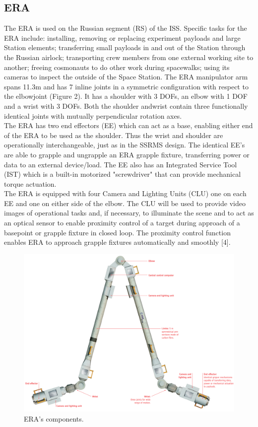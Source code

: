 \documentclass[a4paper,12pt,oneside]{report}
\begin{document}
\subsection{ERA}
The ERA is used on the Russian segment (RS) of the ISS. Specific tasks for the ERA include: installing, removing or replacing experiment payloads
and large Station elements; transferring small payloads in and out of the Station through the Russian airlock; transporting crew members from one external working site
to another; freeing cosmonauts to do other work during spacewalks; using its cameras to inspect the outside of the Space Station.
The ERA manipulator arm spans 11.3m and has 7 inline joints in a symmetric configuration with respect to the elbowjoint (Figure 2). It has a shoulder with 3 DOFs, an elbow with 1 DOF and a wrist with 3 DOFs. Both the shoulder andwrist contain three functionally identical joints with mutually perpendicular rotation axes.\\
The ERA has two end effectors (EE) which can act as a base, enabling either end of the ERA to be used as the shoulder. Thus the wrist and shoulder are operationally interchangeable, just as in the SSRMS design. The identical EE’s are able to grapple and ungrapple an ERA grapple fixture, transferring power or data to an external device/load. The EE also has an Integrated Service Tool (IST) which is a built-in motorized "screwdriver" that can provide mechanical torque
actuation.\\
The ERA is equipped with four Camera and Lighting Units (CLU) one on each EE and one on either side of the elbow. The CLU will be used to provide video images of operational tasks and, if necessary, to illuminate the scene and to act as an optical sensor to enable proximity control of a target during approach of a basepoint or grapple fixture in closed loop. The proximity control function enables ERA to approach grapple fixtures automatically and smoothly [4].
\begin{figure}[h]
  \centering
  \includegraphics[scale=0.4]{ERA.png}
  \caption{ERA's components.} 
  \label{ERA}
\end{figure}
\end{document}
